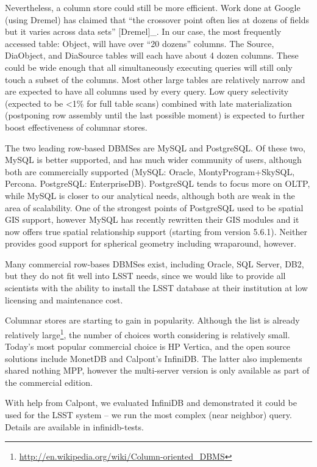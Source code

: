 \documentclass[DM,lsstdraft,toc]{lsstdoc}
\begin{document}
Nevertheless, a column store could still be more efficient. Work done at
Google (using Dremel) has claimed that ``the crossover point often lies
at dozens of fields but it varies across data sets'' {[}Dremel{]}\_. In
our case, the most frequently accessed table: Object, will have over
``20 dozens'' columns. The Source, DiaObject, and DiaSource tables will
each have about 4 dozen columns. These could be wide enough that all
simultaneously executing queries will still only touch a subset of the
columns. Most other large tables are relatively narrow and are expected
to have all columns used by every query. Low query selectivity (expected
to be \textless{}1\% for full table scans) combined with late
materialization (postponing row assembly until the last possible moment)
is expected to further boost effectiveness of columnar stores.

The two leading row-based DBMSes are MySQL and PostgreSQL. Of these two,
MySQL is better supported, and has much wider community of users,
although both are commercially supported (MySQL: Oracle,
MontyProgram+SkySQL, Percona. PostgreSQL: EnterpriseDB). PostgreSQL
tends to focus more on OLTP, while MySQL is closer to our analytical
needs, although both are weak in the area of scalability. One of the
strongest points of PostgreSQL used to be spatial GIS support, however
MySQL has recently rewritten their GIS modules and it now offers true
spatial relationship support (starting from version 5.6.1). Neither
provides good support for spherical geometry including wraparound,
however.

Many commercial row-bases DBMSes exist, including Oracle, SQL Server,
DB2, but they do not fit well into LSST needs, since we would like to
provide all scientists with the ability to install the LSST database at
their institution at low licensing and maintenance cost.

Columnar stores are starting to gain in popularity. Although
the list is
already relatively large\footnote{\url{http://en.wikipedia.org/wiki/Column-oriented_DBMS}}, the number of choices worth considering is
relatively small. Today's most popular commercial choice is HP Vertica,
and the open source solutions include MonetDB and Calpont's InfiniDB.
The latter also implements shared nothing MPP, however the multi-server
version is only available as part of the commercial edition.

With help from Calpont, we evaluated InfiniDB and demonstrated it could
be used for the LSST system -- we run the most complex (near neighbor)
query. Details are available in infinidb-tests.
\end{document}
